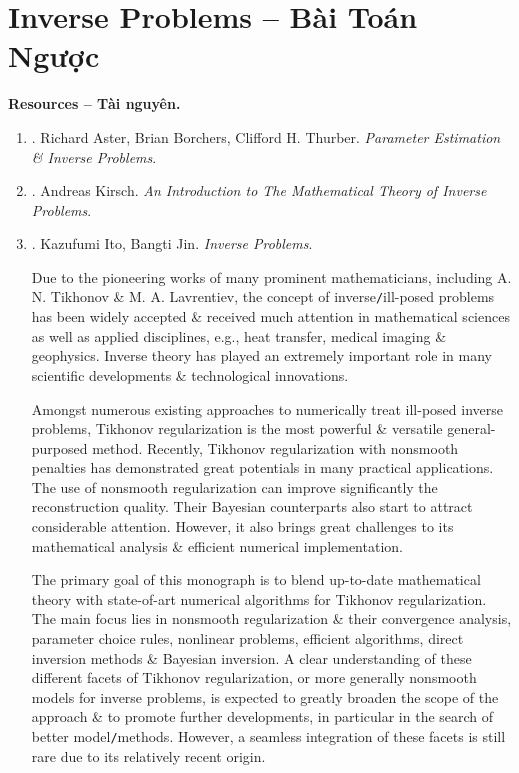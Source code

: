 \documentclass{article}
\begin{document}

\section{Inverse Problems -- Bài Toán Ngược}
\textbf{\textsf{Resources -- Tài nguyên.}}
\begin{enumerate}
	\item \cite{Aster_Borchers_Thurber2018}. {\sc Richard Aster, Brian Borchers, Clifford H. Thurber}. {\it Parameter Estimation \& Inverse Problems}.
	\item \cite{Kirsch2021}. {\sc Andreas Kirsch}. {\it An Introduction to The Mathematical Theory of Inverse Problems}.
	\item \cite{Ito_Jin2015}. {\sc Kazufumi Ito, Bangti Jin}. {\it Inverse Problems}.
	
	
	Due to the pioneering works of many prominent mathematicians, including {\sc A. N. Tikhonov \& M. A. Lavrentiev}, the concept of inverse{\tt/}ill-posed problems has been widely accepted \& received much attention in mathematical sciences as well as applied disciplines, e.g., heat transfer, medical imaging \& geophysics. Inverse theory has played an extremely important role in many scientific developments \& technological innovations.
	
	Amongst numerous existing approaches to numerically treat ill-posed inverse problems, Tikhonov regularization is the most powerful \& versatile general-purposed method. Recently, Tikhonov regularization with nonsmooth penalties has demonstrated great potentials in many practical applications. The use of nonsmooth regularization can improve significantly the reconstruction quality. Their Bayesian counterparts also start to attract considerable attention. However, it also brings great challenges to its mathematical analysis \& efficient numerical implementation.
	
	The primary goal of this monograph is to blend up-to-date mathematical theory with state-of-art numerical algorithms for Tikhonov regularization. The main focus lies in nonsmooth regularization \& their convergence analysis, parameter choice rules, nonlinear problems, efficient algorithms, direct inversion methods \& Bayesian inversion. A clear understanding of these different facets of Tikhonov regularization, or more generally nonsmooth models for inverse problems, is expected to greatly broaden the scope of the approach \& to promote further developments, in particular in the search of better model{\tt/}methods. However, a seamless integration of these facets is still rare due to its relatively recent origin.
	

\end{enumerate}
\end{document}
